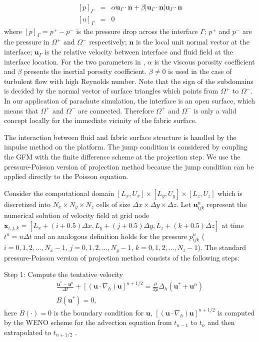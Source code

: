 \begin{eqnarray} \label{jumpcond} {[p]}_{\Gamma} &=& \alpha
\mathbf{u}_\Gamma\cdot \mathbf{n} + \beta |\mathbf{u}_\Gamma\cdot \mathbf{n}|
\mathbf{u}_\Gamma\cdot \mathbf{n} \\
{[u]}_{\Gamma} &=& 0 \end{eqnarray}
where $[p]_{\Gamma}=p^+ - p^-$ is the
pressure drop across the interface $\Gamma$; $p^+$ and $p^-$ are the pressure in
$\Omega^+$ and $\Omega^-$ respectively; $\mathbf{n}$ is the local unit normal
vector at the interface; $\mathbf{u}_\Gamma$ is the relative velocity between
interface and fluid field at the interface location. For the two parameters in
, $\alpha$ is the viscous porosity coefficient and $\beta$ presents
the inertial porosity coefficient. $\beta \neq 0$ is used in the case of
turbulent flow with high Reynolds number.  Note that the sign of the subdomains
is decided by the normal vector of surface triangles which points from
$\Omega^+$ to $\Omega^-$.  In our application of parachute simulation, the
interface is an open surface, which means that $\Omega^+$ and $\Omega^-$ are
connected. Therefore $\Omega^+$ and $\Omega^-$ is only a valid concept locally
for the immediate vicinity of the fabric surface.

The interaction between fluid and fabric surface structure is handled by the
impulse method \cite{KimLiLi12} on the \FronTierp platform. The jump condition
 is considered by coupling the GFM with the finite difference
scheme at the projection step. We use the pressure-Poisson version of
projection method because the jump condition can be applied directly to the
Poisson equation.

Consider the computational domain $[L_x,U_x]\times[L_y,U_y]\times[L_z,U_z]$
which is discretized into $N_x\times N_y\times N_z$ cells of size $\Delta
x\times\Delta y\times\Delta z$. Let $\mathbf{u}^n_{ijk}$ represent the
numerical solution of velocity field at grid node  $\mathbf{x}_{i,j,k} =
[L_x+(i+0.5)\Delta x,L_y+(j+0.5)\Delta y, L_z+(k+0.5)\Delta z]$ at time $t^n =
n\Delta t$ and an analogous definition holds for the pressure $p^n_{ijk}$ ($i =
0,1,2,...,N_x-1$, $j = 0,1,2,...,N_y-1$, $k = 0,1,2,...,N_z-1$). The standard
pressure-Poisson version of projection method consists of the following steps:

Step 1: Compute the tentative velocity
\begin{eqnarray}
\frac{\mathbf{u}^*-\mathbf{u}^n}{\Delta t}+
[(\mathbf{u}\cdot\nabla_h)\mathbf{u}]^{n+1/2}
=\frac{\mu}{2\rho}\Delta_h(\mathbf{u}^*+\mathbf{u}^n)\\ B(\mathbf{u}^*) = 0,
\end{eqnarray} here $B(\cdot) = 0$ is the boundary condition for $\mathbf{u}$,
$[(\mathbf{u}\cdot\nabla_h)\mathbf{u}]^{n+1/2}$ is computed by the WENO scheme
\cite{WENO96} for the advection equation from $t_{n-1}$ to $t_{n}$ and then
extrapolated to $t_{n+1/2}$ \cite{KimMoin85}.

